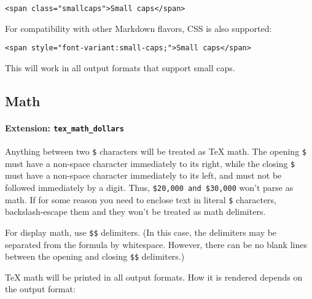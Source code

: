 \documentclass[
]{article}
\begin{document}
\begin{verbatim}
<span class="smallcaps">Small caps</span>
\end{verbatim}

For compatibility with other Markdown flavors, CSS is also supported:

\begin{verbatim}
<span style="font-variant:small-caps;">Small caps</span>
\end{verbatim}

This will work in all output formats that support small caps.

\hypertarget{math}{%
\subsection{Math}\label{math}}

\hypertarget{extension-tex_math_dollars}{%
\paragraph{\texorpdfstring{Extension:
\texttt{tex\_math\_dollars}}{Extension: tex\_math\_dollars}}\label{extension-tex_math_dollars}}

Anything between two \texttt{\$} characters will be treated as TeX math.
The opening \texttt{\$} must have a non-space character immediately to
its right, while the closing \texttt{\$} must have a non-space character
immediately to its left, and must not be followed immediately by a
digit. Thus, \texttt{\$20,000\ and\ \$30,000} won't parse as math. If
for some reason you need to enclose text in literal \texttt{\$}
characters, backslash-escape them and they won't be treated as math
delimiters.

For display math, use \texttt{\$\$} delimiters. (In this case, the
delimiters may be separated from the formula by whitespace. However,
there can be no blank lines between the opening and closing
\texttt{\$\$} delimiters.)

TeX math will be printed in all output formats. How it is rendered
depends on the output format:
\end{document}
